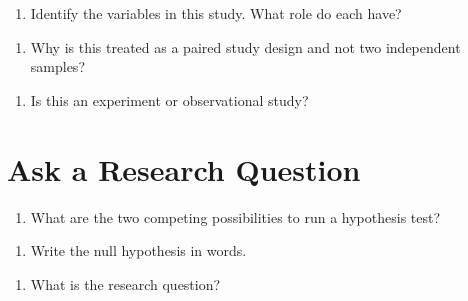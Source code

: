 \documentclass[
]{report}
\providecommand{\tightlist}{%
  \setlength{\itemsep}{0pt}\setlength{\parskip}{0pt}}
\begin{document}
\begin{enumerate}
\def\labelenumi{\arabic{enumi}.}
\setcounter{enumi}{1}
\tightlist
\item
  Identify the variables in this study. What role do each have?
\end{enumerate}

\vspace{1in}

\begin{enumerate}
\def\labelenumi{\arabic{enumi}.}
\setcounter{enumi}{2}
\tightlist
\item
  Why is this treated as a paired study design and not two independent samples?
\end{enumerate}

\vspace{1in}

\begin{enumerate}
\def\labelenumi{\arabic{enumi}.}
\setcounter{enumi}{3}
\tightlist
\item
  Is this an experiment or observational study?
\end{enumerate}

\vspace{0.5in}

\hypertarget{ask-a-research-question-1}{%
\section{Ask a Research Question}\label{ask-a-research-question-1}}

\begin{enumerate}
\def\labelenumi{\arabic{enumi}.}
\setcounter{enumi}{4}
\tightlist
\item
  What are the two competing possibilities to run a hypothesis test?
\end{enumerate}

\vspace{1in}

\begin{enumerate}
\def\labelenumi{\arabic{enumi}.}
\setcounter{enumi}{5}
\tightlist
\item
  Write the null hypothesis in words.
\end{enumerate}

\vspace{1in}

\begin{enumerate}
\def\labelenumi{\arabic{enumi}.}
\setcounter{enumi}{6}
\tightlist
\item
  What is the research question?
\end{enumerate}
\end{document}
